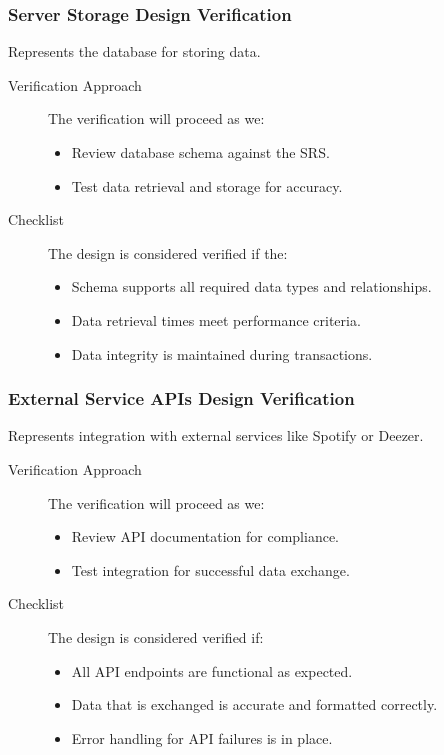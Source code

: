 \documentclass[12pt, titlepage]{article}
\begin{document}
\subsubsection{Server Storage Design Verification}
Represents the database for storing data.
\begin{description}
  \item[Verification Approach] The verification will proceed as we:
  \begin{itemize}[leftmargin=0cm]
    \item Review database schema against the SRS.
    \item Test data retrieval and storage for accuracy.
  \end{itemize}
  \item[Checklist] The design is considered verified if the:
    \begin{itemize}[label=$\square$,leftmargin=0cm]
    \item Schema supports all required data types and relationships.
    \item Data retrieval times meet performance criteria.
    \item Data integrity is maintained during transactions.
  \end{itemize}
\end{description}

\subsubsection{External Service APIs Design Verification}
Represents integration with external services like Spotify or Deezer.
\begin{description}
  \item[Verification Approach] The verification will proceed as we:
  \begin{itemize}[leftmargin=0cm]
    \item Review API documentation for compliance.
    \item Test integration for successful data exchange.
  \end{itemize}
  \item[Checklist] The design is considered verified if:
    \begin{itemize}[label=$\square$,leftmargin=0cm]
    \item All API endpoints are functional as expected.
    \item Data that is exchanged is accurate and formatted correctly.
    \item Error handling for API failures is in place.
  \end{itemize}
\end{description}
\end{document}
